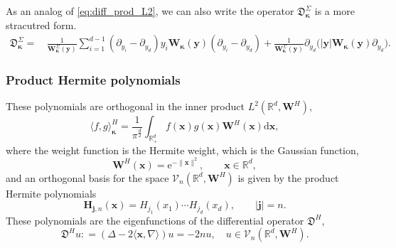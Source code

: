 \documentclass{amsart}
\theoremstyle{remark}
\def\la{{\langle}}
\def\ra{{\rangle}}
\def\d{\mathrm{d}}
\def\e{\mathrm{e}}
\def\fD{{\mathfrak D}}
\def\la{{\langle}}
\def\ra{{\rangle}}
\def\jb{{\bm j}}
\def\xb{{\bm x}}
\def\yb{{\bm y}}
\def\Hb{{\bm H}}
\def\Wb{{\bm W}}
\def\CV{{\mathcal V}}
\def\RR{{\mathbb R}}
\def\bk{{\boldsymbol{\kappa}}}
\begin{document}
As an analog of \eqref{eq:diff_prod_L2}, we can also write the operator $ \fD_\bk^\Sigma$ is a more stracutred 
form.
\begin{align}\label{eq:fD-L2}
   \fD_\bk^\Sigma  =\, &  \frac{1}{\Wb_\bk^\Sigma(\yb)}  \sum_{i=1}^{d-1} (\partial_{y_i} - \partial_{y_d}) y_i \Wb_\bk(\yb)  
   (\partial_{y_i} - \partial_{y_d})  
    + \frac{1}{\Wb_\bk^\Sigma(\yb)} \partial_{y_d} \big (|\yb| \Wb_\bk(\yb) \partial_{y_d}\big). 
\end{align}
 
\subsubsection{Product Hermite polynomials}
These polynomials are orthogonal in the inner product $L^2(\RR^d, \bm W^H)$, 
$$
    \la f, g \ra_\bk^H = \frac{1}{\pi^{\frac{d}2} } \int_{\RR_+^d} f(\xb) g(\xb)   \Wb^H(\xb) \d \xb,
$$  
where the weight function is the Hermite weight, which is the Gaussian function,  
\begin{equation}\label{eq:W_H}
         \Wb^H(\xb) =  \e^{- \|\xb\|^2}, \qquad \xb \in \RR^d,
\end{equation}
and an orthogonal basis for the space $\CV_n(\RR^d, \Wb^H)$ is given by the product Hermite polynomials 
\begin{equation}\label{eq:prod_H}
    \Hb_{\jb,n} (\xb) = H_{j_1}(x_1) \cdots  H_{j_d}(x_d), \qquad |\jb|= n. 
\end{equation}
These polynomials are the eigenfunctions of the differential operator $\fD^H$,
\begin{equation}\label{eq:diff-eqnH}
   \fD^H u : = ( \Delta - 2 \la \xb, \nabla \ra )u = - 2 n u, 
    \quad u \in \CV_n\left(\RR^d, \bm W^H\right).  
\end{equation}
\end{document}
